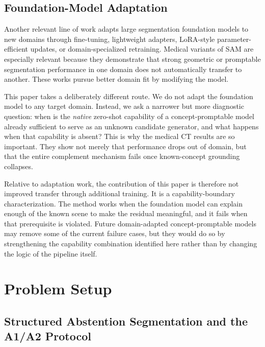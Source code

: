 \documentclass[a4paper,fleqn]{cas-dc}
\begin{document}

\subsection{Foundation-Model Adaptation}
\label{sec:related:adapt}

Another relevant line of work adapts large segmentation foundation models to new domains through fine-tuning, lightweight adapters, LoRA-style parameter-efficient updates, or domain-specialized retraining. Medical variants of SAM are especially relevant because they demonstrate that strong geometric or promptable segmentation performance in one domain does not automatically transfer to another. These works pursue better domain fit by modifying the model.

This paper takes a deliberately different route. We do not adapt the foundation model to any target domain. Instead, we ask a narrower but more diagnostic question: when is the \emph{native} zero-shot capability of a concept-promptable model already sufficient to serve as an unknown candidate generator, and what happens when that capability is absent? This is why the medical CT results are so important. They show not merely that performance drops out of domain, but that the entire complement mechanism fails once known-concept grounding collapses.

Relative to adaptation work, the contribution of this paper is therefore not improved transfer through additional training. It is a capability-boundary characterization. The method works when the foundation model can explain enough of the known scene to make the residual meaningful, and it fails when that prerequisite is violated. Future domain-adapted concept-promptable models may remove some of the current failure cases, but they would do so by strengthening the capability combination identified here rather than by changing the logic of the pipeline itself.


\section{Problem Setup}
\label{sec:problem}

\subsection{Structured Abstention Segmentation and the A1/A2 Protocol}
\label{sec:problem:a1a2}
\end{document}
